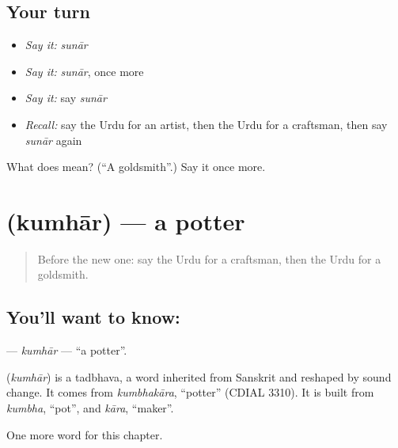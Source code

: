 \subsection*{Your turn}
\begin{itemize}
\raggedright
  \item \emph{Say it:} \emph{sunār}
  \item \emph{Say it:} \emph{sunār}, once more
  \item \emph{Say it:} say \emph{sunār}
  \item \emph{Recall:} say the Urdu for an artist, then the Urdu for a craftsman, then say \emph{sunār} again
\end{itemize}

\begin{tcolorbox}[breakable,colback=teal!4,colframe=teal!35!black,title={Before you move on}]
What does  mean? (\textquotedblleft{}A goldsmith\textquotedblright{}.) Say it once more.
\end{tcolorbox}
\section[\texorpdfstring{\ur{کمہار} (kumhār)}{کمہار (kumhār)}]{ (kumhār) — a potter}

\label{lesson:UR-C238-kumhar}



\begin{quote}
Before the new one: say the Urdu for a craftsman, then the Urdu for a goldsmith.
\end{quote}

\subsection*{You'll want to know: }
\textbf{} — \emph{kumhār} — \textquotedblleft{}a potter\textquotedblright{}.

\begin{cousinweb}
\textbf{} (\emph{kumhār}) is a tadbhava, a word inherited from Sanskrit and reshaped by sound change. It comes from \emph{kumbhakāra}, \textquotedblleft{}potter\textquotedblright{} (CDIAL 3310). It is built from \emph{kumbha}, \textquotedblleft{}pot\textquotedblright{}, and \emph{kāra}, \textquotedblleft{}maker\textquotedblright{}.
\end{cousinweb}

\begin{grammarlens}[title={What you've built}]
One more word for this chapter.
\end{grammarlens}

